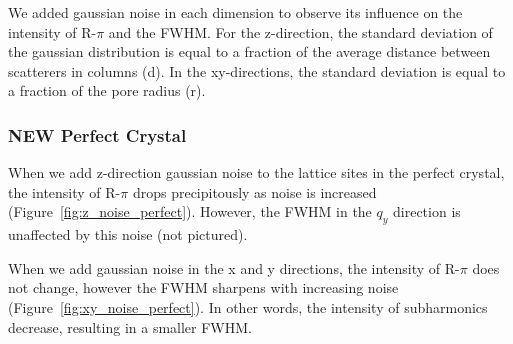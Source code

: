 \documentclass{article}
\begin{document}
  We added gaussian noise in each dimension to observe its influence on the
  intensity of R-$\pi$ and the FWHM. For the z-direction, the standard deviation
  of the gaussian distribution is equal to a fraction of the average distance
  between scatterers in columns (d). In the xy-directions, the standard deviation
  is equal to a fraction of the pore radius (r).

  \subsubsection{\textbf{NEW} Perfect Crystal}

  When we add z-direction gaussian noise to the lattice sites in the perfect
  crystal, the intensity of R-$\pi$ drops precipitously as noise is increased
  (Figure~\ref{fig:z_noise_perfect}).  However, the FWHM in the $q_y$ direction
  is unaffected by this noise (not pictured).

  When we add gaussian noise in the x and y directions, the intensity of
  R-$\pi$ does not change, however the FWHM sharpens with increasing noise
  (Figure~\ref{fig:xy_noise_perfect}). In other words, the intensity of
  subharmonics decrease, resulting in a smaller FWHM.  
\end{document}
